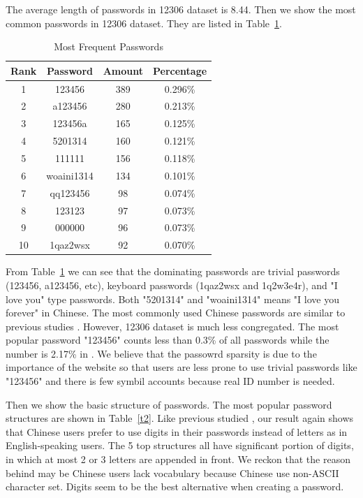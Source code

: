 \documentclass{sig-alternate}
\begin{document}
The average length of passwords in 12306 dataset is 8.44. Then we show the most common passwords in 12306 dataset. They are listed in Table~\ref{t1}.
\begin{table}
\centering
\caption{Most Frequent Passwords}
\begin{tabular}{|c|c|c|c|} \hline
Rank&Password&Amount&Percentage\\ \hline
1&123456&389&0.296\%\\ 
2&a123456&280&0.213\%\\ 
3&123456a&165&0.125\%\\ 
4&5201314&160&0.121\%\\ 
5&111111&156&0.118\%\\ 
6&woaini1314&134&0.101\%\\ 
7&qq123456&98&0.074\%\\ 
8&123123&97&0.073\%\\ 
9&000000&96&0.073\%\\ 
10&1qaz2wsx&92&0.070\%\\ 
\hline\end{tabular}
\label{t1}
\end{table}

From Table~\ref{t1} we can see that the dominating passwords are trivial passwords (123456, a123456, etc), keyboard passwords (1qaz2wsx and 1q2w3e4r), and "I love you" type passwords. Both "5201314" and "woaini1314" means "I love you forever" in Chinese. The most commonly used Chinese passwords are similar to previous studies \cite{li2014large}. However, 12306 dataset is much less congregated. The most popular password "123456" counts less than 0.3\% of all passwords while the number is 2.17\% in \cite{li2014large}. We believe that the passowrd sparsity is due to the importance of the website so that users are less prone to use trivial passwords like "123456" and there is few symbil accounts because real ID number is needed. 

Then we show the basic structure of passwords. The most popular password structures are shown in Table~\ref{t2}. Like previous studied \cite{li2014large}, our result again shows that Chinese users prefer to use digits in their passwords instead of letters as in English-speaking users. The 5 top structures all have significant portion of digits, in which at most 2 or 3 letters are appended in front. We reckon that the reason behind may be Chinese users lack vocabulary because Chinese use non-ASCII character set. Digits seem to be the best alternative when creating a password.
\end{document}
